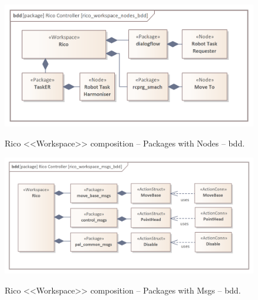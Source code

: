 \documentclass[11pt,oneside,a4paper]{article}
\begin{document}
	\begin{figure}[H]
		\centering
		\begin{center}
			{\includegraphics[scale=1.0]{img/rico_pkg/rico_workspace_nodes_bdd.png}}
		\end{center}
		\caption{Rico <<Workspace>> composition -- Packages with Nodes -- bdd.}
		\label{fig:rico_workspace_nodes_bdd}
	\end{figure}

	\begin{figure}[H]
		\centering
		\begin{center}
			{\includegraphics[scale=1.0]{img/rico_pkg/rico_workspace_msgs_bdd.png}}
		\end{center}
		\caption{Rico <<Workspace>> composition -- Packages with Msgs -- bdd.}
		\label{fig:rico_workspace_msgs_bdd}
	\end{figure}
	
			
\AtNextBibliography{\small}
\printbibliography
	
\end{document}
